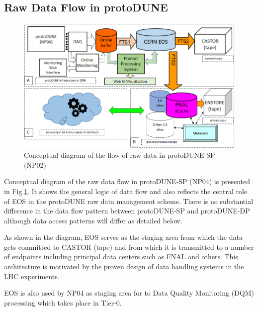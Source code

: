 \documentclass[12pt]{article}
\newcommand{\pd}{protoDUNE\xspace}
\begin{document}
\subsection{Raw Data Flow in \pd}
\label{sec:raw_concept}
\begin{figure}[tbh]
\centering\includegraphics[width=\linewidth]{figures/protoDUNE_data_flow_2017_v2.png}
\caption{\label{fig:raw_concept}Conceptual diagram of the flow of raw data in \pd-SP (NP02)}
\end{figure}

\noindent
Conceptual diagram of the raw data flow in \pd-SP (NP04) is presented in Fig.\ref{fig:raw_concept}. It shows the general logic
of data flow and also reflects the central role of EOS in the \pd raw data management scheme. There is no substantial difference
in the data flow pattern between \pd-SP and \pd-DP although data access patterns will differ as detailed below.

As shown in the diagram, EOS serves as the staging area from which the data gets committed to CASTOR (tape)
and from which it is transmitted to a number of endpoints including principal data centers such as FNAL and others.
This architecture is motivated by the proven design of data handling systems in the LHC experiments.

EOS is also used by NP04 as staging area for to Data Quality Monitoring (DQM) processing which takes place in Tier-0.


\end{document}
